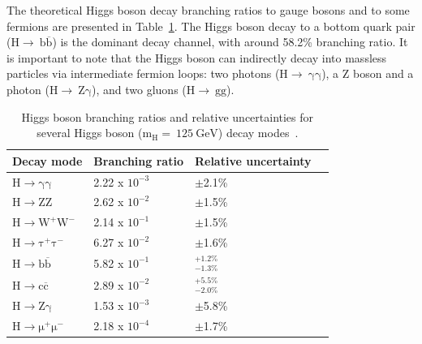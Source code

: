 The theoretical Higgs boson decay branching ratios to gauge bosons and to some fermions are presented in Table~\ref{tab:higgsbrs}. The Higgs boson decay to a bottom quark pair ($\mathrm{H\rightarrow~b\overline{b}}$) is the dominant decay channel, with around 58.2\% branching ratio. It is important to note that the Higgs boson can indirectly decay into massless particles via intermediate fermion loops: two photons ($\mathrm{H\rightarrow~\gamma\gamma}$), a Z boson and a photon ($\mathrm{H\rightarrow~Z\gamma}$), and two gluons ($\mathrm{H\rightarrow~gg}$).
\begin{table}[ht!]
\centering
\caption[Higgs boson branching ratios and relative uncertainties for several Higgs boson ($\mathrm{m_{H}=~125~GeV}$) decay modes]{\label{tab:higgsbrs} Higgs boson branching ratios and relative uncertainties for several Higgs boson ($\mathrm{m_{H}=~125~GeV}$) decay modes~\cite{pdg}.}
\begin{tabularx}{\textwidth}{XXXX}
\hline
Decay mode                                    & Branching ratio  & Relative uncertainty      \\
\hline
$\mathrm{H\rightarrow\gamma\gamma}$           & 2.22 x $10^{-3}$ & $\pm$2.1\%            \\[0pt]
$\mathrm{H\rightarrow ZZ}$                    & 2.62 x $10^{-2}$ & $\pm$1.5\%            \\[0pt]
$\mathrm{H\rightarrow W^{+}W^{-}}$            & 2.14 x $10^{-1}$ & $\pm$1.5\%            \\[0pt]
$\mathrm{H\rightarrow \tau^{+}\tau^{-}}$      & 6.27 x $10^{-2}$ & $\pm$1.6\%            \\[0pt]
$\mathrm{H\rightarrow b\overline{b}}$         & 5.82 x $10^{-1}$ & $^{+1.2\%}_{-1.3\%}$  \\[0pt]
$\mathrm{H\rightarrow c\overline{c}}$         & 2.89 x $10^{-2}$ & $^{+5.5\%}_{-2.0\%}$  \\[0pt]
$\mathrm{H\rightarrow Z\gamma}$               & 1.53 x $10^{-3}$ & $\pm$5.8\%            \\[0pt]
$\mathrm{H\rightarrow \mu^{+}\mu^{-}}$        & 2.18 x $10^{-4}$ & $\pm$1.7\%            \\[0pt]
\hline
\end{tabularx}
\end{table}

